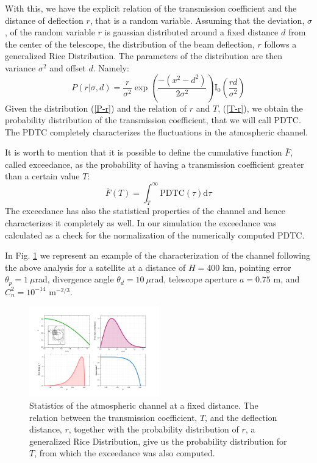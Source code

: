 \documentclass[%
 reprint,
 amsmath,amssymb,
 aps,
]{revtex4-1}
\begin{document}
With this, we have the explicit relation of the transmission coefficient and the distance of deflection $r$, that is a random variable. Assuming that the deviation, $\sigma$, of the random variable $r$ is gaussian distributed around a fixed distance $d$ from the center of the telescope, the distribution of the beam deflection, $r$ follows a generalized Rice Distribution. The parameters of the distribution are then variance $\sigma^2$ and offset $d$. Namely:
\begin{equation}
    P(r|\sigma, d) =\frac{r}{\sigma^2}\exp\left(\frac{-(x^2-d^2)}{2\sigma^2}\right)\mathrm{I}_0\left(\frac{rd}{\sigma^2}\right)
    \label{P-r}
\end{equation}
Given the distribution (\ref{P-r}) and the relation of $r$ and $T$, (\ref{T-r}), we obtain the probability distribution of the transmission coefficient, that we will call PDTC. The PDTC completely characterizes the fluctuations in the atmospheric channel.

It is worth to mention that it is possible to define the cumulative function $\bar{F}$, called exceedance, as the probability of having a transmission coefficient greater than a certain value $T$:
\begin{equation}
    \bar{F}(T) = \int^{\infty}_{T}\mathrm{PDTC}(\tau)\mathrm{d}\tau
\end{equation}
The exceedance has also the statistical properties of the channel and hence characterizes it completely as well. In our simulation the exceedance was calculated as a check for the normalization of the numerically computed PDTC.

In Fig. \ref{RicianDistr} we represent an example of the characterization of the channel following the above analysis for a satellite at a distance of $H=400$ km, pointing error $\theta_p=1\ \mu$rad, divergence angle $\theta_d=10\ \mu$rad, telescope aperture $a=0.75$ m, and $C_n^2=10^{-14}$ m$^{-2/3}$.

\begin{figure}
\centering
\includegraphics[width=0.5\textwidth]{RicianDistr.png}
\caption{Statistics of the atmospheric channel at a fixed distance. The relation between the transmission coefficient, $T$, and the deflection distance, $r$, together with the probability distribution of $r$, a generalized Rice Distribution, give us the probability distribution for $T$, from which the exceedance was also computed.}
\label{RicianDistr}
\end{figure}
\end{document}
